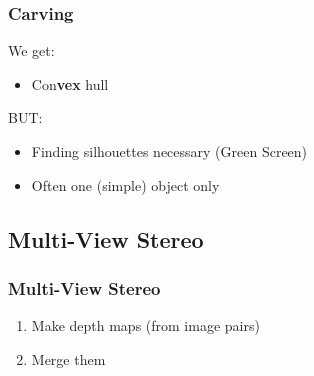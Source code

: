 \documentclass{beamer}
\begin{document}
\begin{frame}
  \frametitle{Carving}
  We get:
  \begin{itemize}
    \item Con\textbf{vex} hull
  \end{itemize}
  BUT:
  \begin{itemize}
    \item Finding silhouettes necessary (Green Screen)
    \item Often one (simple) object only
  \end{itemize}
\end{frame}


\subsection*{Multi-View Stereo}

\begin{frame}
  \frametitle{Multi-View Stereo}
  \begin{enumerate}
    \item Make depth maps (from image pairs)
    \item Merge them
  \end{enumerate}
\end{frame}
\end{document}
